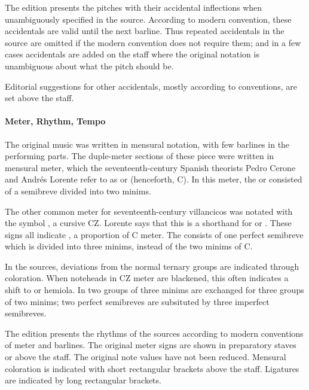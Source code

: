 The edition presents the pitches with their accidental inflections when unambiguously specified in the source.
According to modern convention, these accidentals are valid until the next barline.
Thus repeated accidentals in the source are omitted if the modern convention does not require them; and in a few cases accidentals are added on the staff where the original notation is unambiguous about what the pitch should be.

Editorial suggestions for other accidentals, mostly according to  conventions, are set above the staff.

\paragraph{Meter, Rhythm, Tempo}
The original music was written in mensural notation, with few barlines in the performing parts. 
The duple-meter sections of these piece were written in mensural \meterC{} meter, which the seventeenth-century Spanish theorists Pedro Cerone and Andrés Lorente refer to as  or  (henceforth, C).%
  \autocites[537]{Cerone:Melopeo}[156, 210]{Lorente:Porque}
In this meter, the  or  consisted of a semibreve divided into two minims.%
  \autocites{GonzalezValle:MusicaTexto}{GonzalezValle:CompasCabezon}

The other common meter for seventeenth-century villancicos was notated with the symbol \meterCZ{}, a cursive CZ.
Lorente says that this is a shorthand for \meterCThree{} or \meterCThreeTwo{}.%
  \autocite[165]{Lorente:Porque}
These signs all indicate , a proportion of C meter.
The  consists of one perfect semibreve which is divided into three minims, instead of the two minims of C.

In the sources, deviations from the normal ternary groups are indicated through coloration. 
When noteheads in CZ meter are blackened, this often indicates a shift to  or hemiola.
In  two groups of three minims are exchanged for three groups of two minims; two perfect semibreves are subsituted by three imperfect semibreves.

The edition presents the rhythms of the sources according to modern conventions of meter and barlines.
The original meter signs are shown in preparatory staves or above the staff.
The original note values have not been reduced.
Mensural coloration is indicated with short rectangular brackets above the staff.
Ligatures are indicated by long rectangular brackets.

